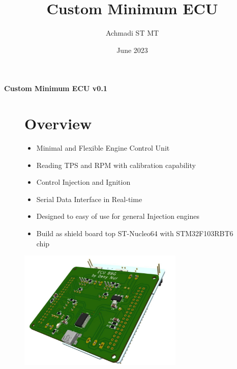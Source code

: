 \documentclass[a4paper,12pt,oneside,pdflatex,italian,final,twocolumn]{article}
\title{Custom Minimum ECU}
\author{Achmadi ST MT}
\date{June 2023}
\begin{document}
	\pagestyle{fancy}
	
	\chead{\today}
	
	\onecolumn
	
	\begin{figure}
		
	\end{figure}\begin{minipage}{0.47\textwidth}
		\centering
		
	\end{minipage}
	\hfill
	\begin{minipage}{0.47\textwidth}
		\raggedleft
		\Huge \textbf{Custom Minimum ECU v0.1}
	\end{minipage}

	\begin{figure}
		\begin{minipage}{0.47\textwidth}
			
			\section{Overview}
			\begin{itemize}
				\item Minimal and Flexible Engine Control Unit
				\item Reading TPS and RPM with calibration capability
				\item Control Injection and Ignition 
				\item Serial Data Interface in Real-time
				\item Designed to easy of use for general Injection engines
				\item Build as shield board top ST-Nucleo64 with STM32F103RBT6 chip
			\end{itemize}
			
		\end{minipage}
		\hfill
		\begin{minipage}{0.47\textwidth}
			\centering
			\includegraphics[width=0.7\textwidth,right]{images/mockup.jpg}
			
		\end{minipage}
	\end{figure}
\end{document}
